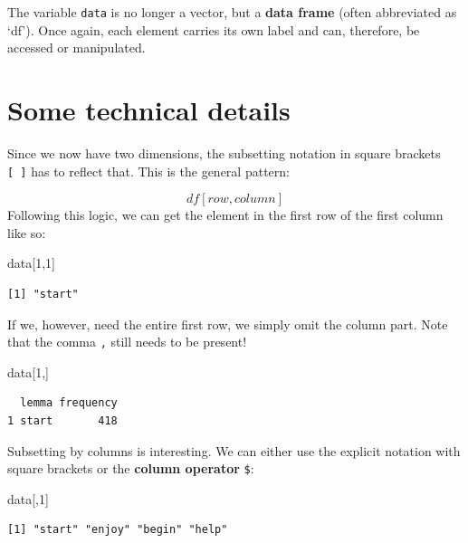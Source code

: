 \documentclass[
  11pt,
  letterpaper,
  DIV=11,
  numbers=noendperiod]{scrreprt}
\newenvironment{Shaded}{\begin{snugshade}}{\end{snugshade}}
\newcommand{\DecValTok}[1]{\textcolor[rgb]{0.68,0.00,0.00}{#1}}
\newcommand{\NormalTok}[1]{\textcolor[rgb]{0.00,0.23,0.31}{#1}}
\begin{document}
The variable \texttt{data} is no longer a vector, but a \textbf{data
frame} (often abbreviated as `df'). Once again, each element carries its
own label and can, therefore, be accessed or manipulated.

\section{Some technical details}\label{sec-df}

Since we now have two dimensions, the subsetting notation in square
brackets \texttt{{[}\ {]}} has to reflect that. This is the general
pattern:

\[ df[row, column] \] Following this logic, we can get the element in
the first row of the first column like so:

\begin{Shaded}
\begin{Highlighting}[]
\NormalTok{data[}\DecValTok{1}\NormalTok{,}\DecValTok{1}\NormalTok{]}
\end{Highlighting}
\end{Shaded}

\begin{verbatim}
[1] "start"
\end{verbatim}

If we, however, need the entire first row, we simply omit the column
part. Note that the comma \texttt{,} still needs to be present!

\begin{Shaded}
\begin{Highlighting}[]
\NormalTok{data[}\DecValTok{1}\NormalTok{,]}
\end{Highlighting}
\end{Shaded}

\begin{verbatim}
  lemma frequency
1 start       418
\end{verbatim}

Subsetting by columns is interesting. We can either use the explicit
notation with square brackets or the \textbf{column operator}
\texttt{\$}:

\begin{Shaded}
\begin{Highlighting}[]
\NormalTok{data[,}\DecValTok{1}\NormalTok{]}
\end{Highlighting}
\end{Shaded}

\begin{verbatim}
[1] "start" "enjoy" "begin" "help" 
\end{verbatim}
\end{document}
